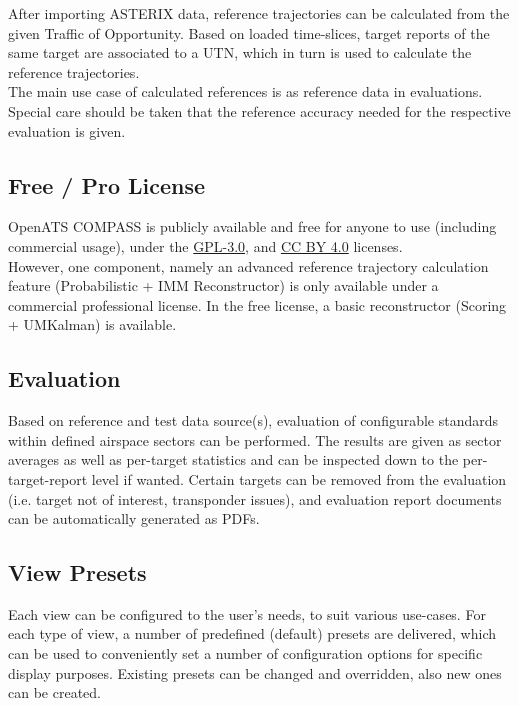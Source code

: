 After importing ASTERIX data, reference trajectories can be calculated from the given Traffic of Opportunity. Based on loaded time-slices, target reports of the same target are associated to a UTN, which in turn is used to calculate the reference trajectories. \\

The main use case of calculated references is as reference data in evaluations. Special care should be taken that the reference accuracy needed for the respective evaluation is given. \\

\subsection*{Free / Pro License}

OpenATS COMPASS is publicly available and free for anyone to use (including commercial usage), under the \href{https://www.gnu.org/licenses/gpl-3.0.en.html}{GPL-3.0}, and \href{https://creativecommons.org/licenses/by/4.0/}{CC BY 4.0} licenses. \\

However, one component, namely an advanced reference trajectory calculation feature (Probabilistic + IMM Reconstructor) is only available under a commercial professional license. In the free license, a basic reconstructor (Scoring + UMKalman) is available.

\subsection*{Evaluation}

Based on reference and test data source(s), evaluation of configurable standards within defined airspace sectors can be performed. The results are given as sector averages as well as per-target statistics and can be inspected down to the per-target-report level if wanted. Certain targets can be removed from the evaluation (i.e. target not of interest, transponder issues), and evaluation report documents can be automatically generated as PDFs.

\subsection*{View Presets}

Each view can be configured to the user's needs, to suit various use-cases. For each type of view, a number of predefined (default) presets are delivered, which can be used to conveniently set a number of configuration options for specific display purposes. Existing presets can be changed and overridden, also new ones can be created.

